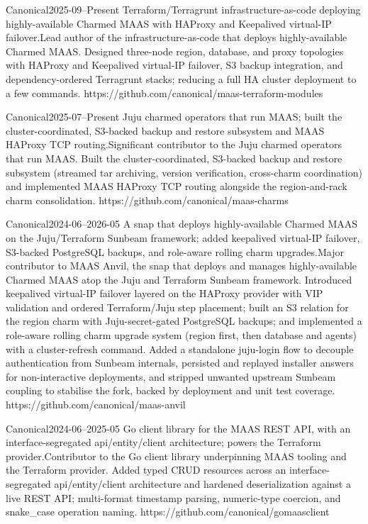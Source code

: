 {Canonical}{2025-09--Present}
{\iflean Terraform/Terragrunt infrastructure-as-code deploying highly-available Charmed MAAS with HAProxy and Keepalived virtual-IP failover.\else Lead author of the infrastructure-as-code that deploys highly-available Charmed MAAS. Designed three-node region, database, and proxy topologies with HAProxy and Keepalived virtual-IP failover, S3 backup integration, and dependency-ordered Terragrunt stacks; reducing a full HA cluster deployment to a few commands.\fi}
{https://github.com/canonical/maas-terraform-modules}

{Canonical}{2025-07--Present}
{\iflean Juju charmed operators that run MAAS; built the cluster-coordinated, S3-backed backup and restore subsystem and MAAS HAProxy TCP routing.\else Significant contributor to the Juju charmed operators that run MAAS. Built the cluster-coordinated, S3-backed backup and restore subsystem (streamed tar archiving, version verification, cross-charm coordination) and implemented MAAS HAProxy TCP routing alongside the region-and-rack charm consolidation.\fi}
{https://github.com/canonical/maas-charms}

\iflean\else
{}
{Canonical}{2024-06--2026-05}
{\iflean A snap that deploys highly-available Charmed MAAS on the Juju/Terraform Sunbeam framework; added keepalived virtual-IP failover, S3-backed PostgreSQL backups, and role-aware rolling charm upgrades.\else Major contributor to MAAS Anvil, the snap that deploys and manages highly-available Charmed MAAS atop the Juju and Terraform Sunbeam framework. Introduced keepalived virtual-IP failover layered on the HAProxy provider with VIP validation and ordered Terraform/Juju step placement; built an S3 relation for the region charm with Juju-secret-gated PostgreSQL backups; and implemented a role-aware rolling charm upgrade system (region first, then database and agents) with a cluster-refresh command. Added a standalone juju-login flow to decouple authentication from Sunbeam internals, persisted and replayed installer answers for non-interactive deployments, and stripped unwanted upstream Sunbeam coupling to stabilise the fork, backed by deployment and unit test coverage.\fi}
{https://github.com/canonical/maas-anvil}

{Canonical}{2024-06--2025-05}
{\iflean Go client library for the MAAS REST API, with an interface-segregated api/entity/client architecture; powers the Terraform provider.\else Contributor to the Go client library underpinning MAAS tooling and the Terraform provider. Added typed CRUD resources across an interface-segregated api/entity/client architecture and hardened deserialization against a live REST API; multi-format timestamp parsing, numeric-type coercion, and snake\_case operation naming.\fi}
{https://github.com/canonical/gomaasclient}
\fi

